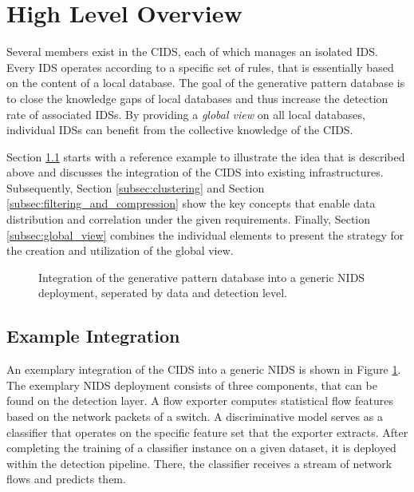 \documentclass[../../main.tex]{subfiles}
\begin{document}
\section{High Level Overview}\label{sec:high_level_overview}

Several members exist in the CIDS, each of which manages an isolated IDS. Every IDS operates according to a specific set of rules, that is essentially based on the content of a local database. The goal of the generative pattern database is to close the knowledge gaps of local databases and thus increase the detection rate of associated IDSs. By providing a \textit{global view} on all local databases, individual IDSs can benefit from the collective knowledge of the CIDS.

Section \ref{subsec:example_integration} starts with a reference example to illustrate the idea that is described above and discusses the integration of the CIDS into existing infrastructures. Subsequently, Section \ref{subsec:clustering} and Section \ref{subsec:filtering_and_compression} show the key concepts that enable data distribution and correlation under the given requirements. Finally, Section \ref{subsec:global_view} combines the individual elements to present the strategy for the creation and utilization of the global view.

\begin{figure}[t!]
    \centering
    
    \caption[Example integration of the $PDB$]{Integration of the generative pattern database into a generic NIDS deployment, seperated by data and detection level.}
    \label{fig:high_level_architecture}
\end{figure}



\subsection{Example Integration}\label{subsec:example_integration}
An exemplary integration of the CIDS into a generic NIDS is shown in Figure \ref{fig:high_level_architecture}. The exemplary NIDS deployment consists of three components, that can be found on the detection layer. A flow exporter computes statistical flow features based on the network packets of a switch. A discriminative model serves as a classifier that operates on the specific feature set that the exporter extracts. After completing the training of a classifier instance on a given dataset, it is deployed within the detection pipeline. There, the classifier receives a stream of network flows and predicts them.
\end{document}

